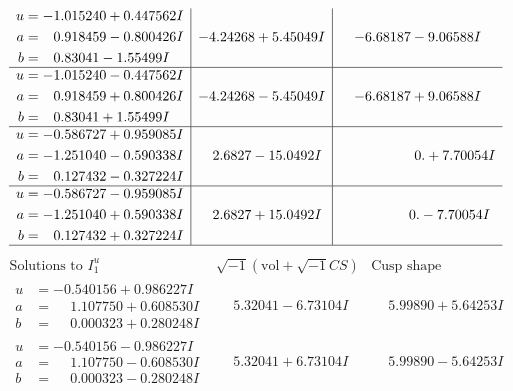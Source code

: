 \documentclass[1p]{elsarticle_modified}
\theoremstyle{definition}
\newcommand{\I}{\sqrt{-1}}
\begin{document}
$$\begin{array}{c|c|c}
\begin{aligned}
u &= -1.015240 + 0.447562 I \\
a &= \phantom{-}0.918459 - 0.800426 I \\
b &= \phantom{-}0.83041 - 1.55499 I\end{aligned}
 & -4.24268 + 5.45049 I & -6.68187 - 9.06588 I \\ \hline\begin{aligned}
u &= -1.015240 - 0.447562 I \\
a &= \phantom{-}0.918459 + 0.800426 I \\
b &= \phantom{-}0.83041 + 1.55499 I\end{aligned}
 & -4.24268 - 5.45049 I & -6.68187 + 9.06588 I \\ \hline\begin{aligned}
u &= -0.586727 + 0.959085 I \\
a &= -1.251040 - 0.590338 I \\
b &= \phantom{-}0.127432 - 0.327224 I\end{aligned}
 & \phantom{-}2.6827 - 15.0492 I & \phantom{-0.000000 -}0. + 7.70054 I \\ \hline\begin{aligned}
u &= -0.586727 - 0.959085 I \\
a &= -1.251040 + 0.590338 I \\
b &= \phantom{-}0.127432 + 0.327224 I\end{aligned}
 & \phantom{-}2.6827 + 15.0492 I & \phantom{-0.000000 } 0. - 7.70054 I\\
 \hline 
 \end{array}$$\newpage$$\begin{array}{c|c|c}  
\text{Solutions to }I^u_{1}& \I (\text{vol} + \sqrt{-1}CS) & \text{Cusp shape}\\
 \hline 
\begin{aligned}
u &= -0.540156 + 0.986227 I \\
a &= \phantom{-}1.107750 + 0.608530 I \\
b &= \phantom{-}0.000323 + 0.280248 I\end{aligned}
 & \phantom{-}5.32041 - 6.73104 I & \phantom{-}5.99890 + 5.64253 I \\ \hline\begin{aligned}
u &= -0.540156 - 0.986227 I \\
a &= \phantom{-}1.107750 - 0.608530 I \\
b &= \phantom{-}0.000323 - 0.280248 I\end{aligned}
 & \phantom{-}5.32041 + 6.73104 I & \phantom{-}5.99890 - 5.64253 I \\ \hline\begin{aligned}

\end{aligned}
\end{array}$$
\end{document}

